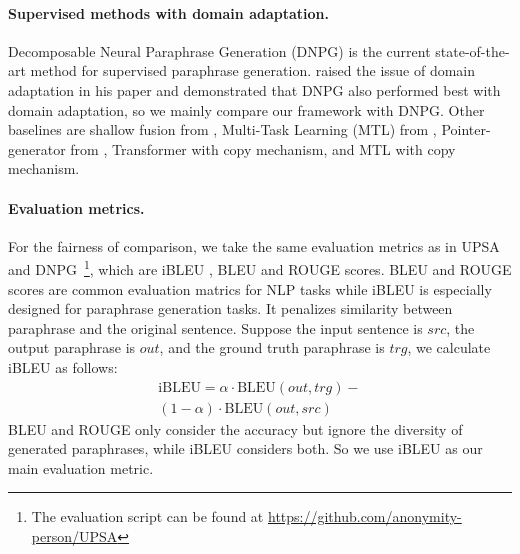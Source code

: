 \paragraph{Supervised methods with domain adaptation. } Decomposable Neural Paraphrase Generation (DNPG) \citep{li2019decomposable} is the current state-of-the-art method for supervised paraphrase generation. \citet{li2019decomposable} raised the issue of domain adaptation in his paper and demonstrated that DNPG also performed best with domain adaptation, so we mainly compare our framework with DNPG. Other baselines are shallow fusion from \citet{gulcehre2015using}, Multi-Task Learning (MTL) from \citet{domhan2017using}, Pointer-generator from \citet{see2017get}, Transformer \citep{vaswani2017attention} with copy mechanism, and MTL with copy mechanism. 

\paragraph{Evaluation metrics. } For the fairness of comparison, 
we take the same evaluation metrics as in UPSA and 
DNPG~\footnote{The evaluation script can be found at \url{https://github.com/anonymity-person/UPSA}}, which are iBLEU \citep{sun2012joint}, BLEU \citep{papineni2002bleu} and ROUGE \citep{lin2004rouge} scores. 
BLEU and ROUGE scores are common evaluation matrics for NLP tasks while 
iBLEU is especially designed for paraphrase generation tasks. 
It penalizes similarity between paraphrase and the original sentence. 
Suppose the input sentence is $src$, the output paraphrase is $out$, 
and the ground truth paraphrase is $trg$, we calculate iBLEU as follows:
\begin{multline}
\text{iBLEU} = \alpha \cdot \text{BLEU}(out, trg) - \\
(1-\alpha) \cdot \text{BLEU}(out, src)
\end{multline}
BLEU and ROUGE only consider the accuracy but ignore the 
diversity of generated paraphrases, while iBLEU considers both. 
So we use iBLEU as our main evaluation metric.

